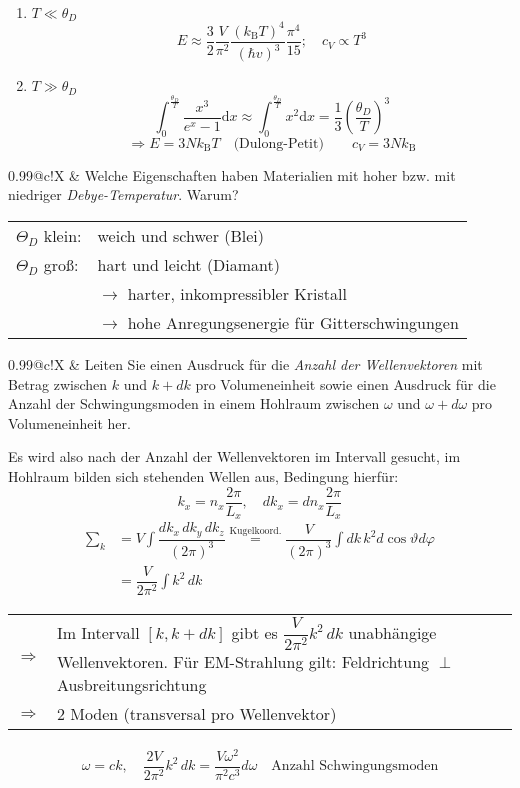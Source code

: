 \documentclass[a4paper,12pt]{scrartcl}
\makeatletter
\def\df#1#2{\dfrac{#1}{#2}}				%
\def\ka#1{\left(#1\right)}				%
\def\d{\mathrm{d}}					%
\def\kB{k_\mathrm{B}}					%
\newcounter{qc}\setcounter{qc}{1}
\newenvironment{fshaded}{
\def\FrameCommand{\fcolorbox{framecolor}{shadecolor}}
\MakeFramed {\FrameRestore}}
{\endMakeFramed}
\def\frage#1{
\begin{fshaded}
\noindent
\begin{tabularx}{0.99\textwidth}{@{}c!{\color{framecolor}\vline}X}
{ \bf \rm \theqc }	&	\noindent #1
\end{tabularx}
\stepcounter{qc}
\end{fshaded}
}
\makeatother
\begin{document}
\begin{enumerate}
	\item $T\ll\theta_D$
		\[ E\approx\frac32\frac V{\pi^2}\frac{(\kB T)^4}{(\hbar v)^3}\frac{\pi^4}{15};\quad c_V\propto T^3 \]
	\item $T\gg\theta_D$
		\[ \int_0^{\frac{\theta_D}T}\frac{x^3}{e^x-1}\d	x\approx\int_0^{\frac{\theta_D}T}x^2\d 
x=\frac13\ka{\frac{\theta_D}T}^3 \]
		\[ \Rightarrow E=3N\kB T\quad\text{(Dulong-Petit)}\qquad c_V=3N\kB  \]
\end{enumerate}


\frage{Welche Eigenschaften haben Materialien mit hoher bzw. mit niedriger \textit{Debye-Temperatur}. Warum?}
\noindent
\noindent
\begin{tabularx}{\textwidth}{@{}lX}
$\Theta_D$ klein: &weich und schwer (Blei)\\
$\Theta_D$ groß: &hart und leicht (Diamant)\\
&$\rightarrow$ harter, inkompressibler Kristall\\
&$\rightarrow$ hohe Anregungsenergie für Gitterschwingungen
\end{tabularx}
 


\frage{Leiten Sie einen Ausdruck für die \textit{Anzahl der Wellenvektoren} mit Betrag zwischen $k$ und $k+dk$ pro 
Volumeneinheit sowie einen Ausdruck für die Anzahl der Schwingungsmoden in einem Hohlraum zwischen $\omega$ und $\omega + 
d\omega$ pro Volumeneinheit her.}
\noindent
Es wird also nach der Anzahl der Wellenvektoren im Intervall gesucht, im Hohlraum bilden sich stehenden Wellen aus, Bedingung 
hierfür:
\begin{equation*}
k_x=n_x \df{2\pi}{L_x},\quad dk_x=dn_x \df{2\pi}{L_x}
\end{equation*}
\begin{align*}
\sum_k &= V \int \df{dk_x\,dk_y\,dk_z}{(2\pi)^3} \stackrel{\text{Kugelkoord.}}{=}\df{V}{(2\pi)^3}\int dk\,k^2 d\cos \vartheta 
d\varphi\\
&=\df{V}{2\pi^2} \int k^2\,dk
\end{align*}
\begin{tabularx}{\textwidth}{@{}lX}
$\Rightarrow$ & Im Intervall $[k,k+dk]$ gibt es $\df{V}{2\pi^2} k^2\,dk$ unabhängige Wellenvektoren. Für EM-Strahlung gilt: 
Feldrichtung $\perp$ Ausbreitungsrichtung\\
$\Rightarrow$ & 2 Moden (transversal pro Wellenvektor)
\end{tabularx}
\begin{align*}
\omega=ck,\quad \df{2V}{2\pi^2}k^2\,dk=\df{V\omega^2}{\pi^2 c^3}d\omega\quad \text{Anzahl Schwingungsmoden}
\end{align*}
\end{document}
